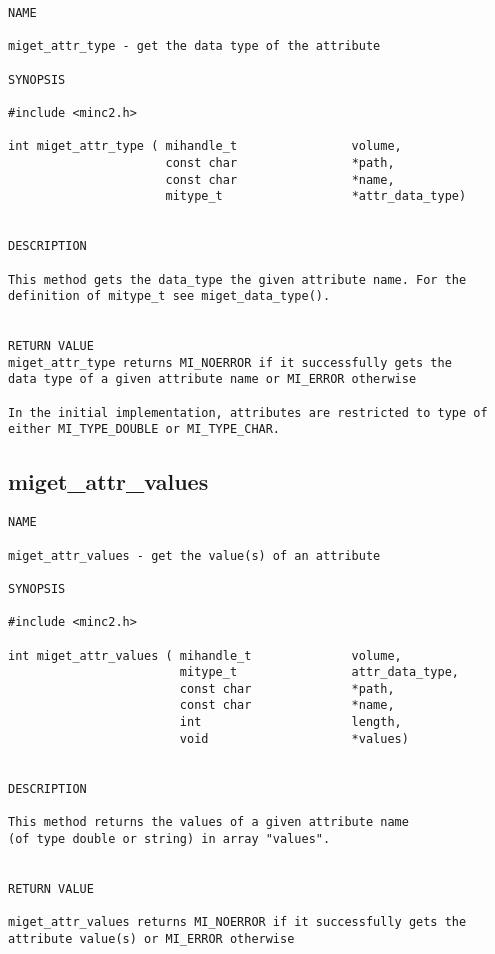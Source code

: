 \documentclass{article}
\begin{document}
\begin{verbatim}
NAME 

miget_attr_type - get the data type of the attribute

SYNOPSIS

#include <minc2.h>

int miget_attr_type ( mihandle_t                volume,
                      const char                *path,
                      const char                *name,
                      mitype_t                  *attr_data_type) 
               
                                
DESCRIPTION

This method gets the data_type the given attribute name. For the
definition of mitype_t see miget_data_type().


RETURN VALUE
miget_attr_type returns MI_NOERROR if it successfully gets the
data type of a given attribute name or MI_ERROR otherwise

In the initial implementation, attributes are restricted to type of
either MI_TYPE_DOUBLE or MI_TYPE_CHAR.

\end{verbatim}

\subsection{miget\_attr\_values}

\begin{verbatim}
NAME 

miget_attr_values - get the value(s) of an attribute

SYNOPSIS

#include <minc2.h>

int miget_attr_values ( mihandle_t              volume, 
                        mitype_t                attr_data_type,
                        const char              *path,
                        const char              *name,
                        int                     length,
                        void                    *values)

                                                
DESCRIPTION

This method returns the values of a given attribute name 
(of type double or string) in array "values".


RETURN VALUE

miget_attr_values returns MI_NOERROR if it successfully gets the
attribute value(s) or MI_ERROR otherwise
\end{verbatim}
\end{document}

